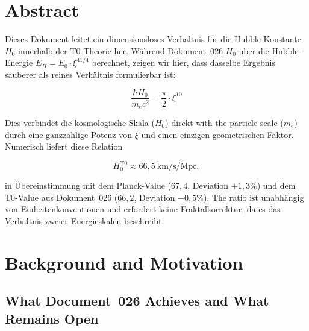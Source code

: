 
\section*{Abstract}

Dieses Dokument leitet ein dimensionsloses Verhältnis für die Hubble-Konstante
$H_0$ innerhalb der T0-Theorie her. Während Dokument~026 $H_0$ über die
Hubble-Energie $E_H = E_0 \cdot \xi^{41/4}$ berechnet, zeigen wir hier,
dass dasselbe Ergebnis sauberer als reines Verhältnis formulierbar ist:

\begin{equation}
    \boxed{\frac{\hbar H_0}{m_e c^2} = \frac{\pi}{2} \cdot \xi^{10}}
    \label{eq:h0_ratio_main}
\end{equation}

Dies verbindet die kosmologische Skala ($H_0$) direkt with the particle scale
($m_e$) durch eine ganzzahlige Potenz von $\xi$ und einen einzigen
geometrischen Faktor. Numerisch liefert diese Relation

\[
H_0^{\text{T0}} \approx 66{,}5 \ \text{km/s/Mpc},
\]

in Übereinstimmung mit dem Planck-Value ($67{,}4$, Deviation $+1{,}3\%$) und dem
T0-Value aus Dokument~026 ($66{,}2$, Deviation $-0{,}5\%$). The ratio
ist unabhängig von Einheitenkonventionen und erfordert keine Fraktalkorrektur,
da es das Verhältnis zweier Energieskalen beschreibt.

\clearpage

\section{Background and Motivation}
\label{sec:motivation}

\subsection{What Document~026 Achieves and What Remains Open}

